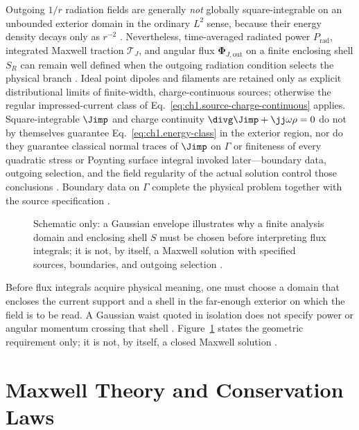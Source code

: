 Outgoing \(1/r\) radiation fields are generally \emph{not} globally square-integrable on an unbounded exterior domain in the ordinary \(L^2\) sense, because their energy density decays only as \(r^{-2}\) \cite{stratton1941}. Nevertheless, time-averaged radiated power \(P_{\mathrm{rad}}\), integrated Maxwell traction \(\boldsymbol{\mathcal{T}}_J\), and angular flux \(\boldsymbol{\Phi}_{J,\mathrm{out}}\) on a finite enclosing shell \(S_R\) can remain well defined when the outgoing radiation condition selects the physical branch \cite{stratton1941}. Ideal point dipoles and filaments are retained only as explicit distributional limits of finite-width, charge-continuous sources; otherwise the regular impressed-current class of Eq.~\eqref{eq:ch1.source-charge-continuous} applies. Square-integrable \(\Jimp\) and charge continuity \(\divg\Jimp+\jj\omega\rho=0\) do not by themselves guarantee Eq.~\eqref{eq:ch1.energy-class} in the exterior region, nor do they guarantee classical normal traces of \(\Jimp\) on \(\Gamma\) or finiteness of every quadratic stress or Poynting surface integral invoked later---boundary data, outgoing selection, and the field regularity of the actual solution control those conclusions \cite{stratton1941}. Boundary data on \(\Gamma\) complete the physical problem together with the source specification \cite{maxwell1873,stratton1941}.
\label{eq:ch1.admissible-space}

\begin{figure}[t]
\centering
\VolIPhysFig{\VolIPhysGaussianWaist}
\caption{Schematic only: a Gaussian envelope illustrates why a finite analysis domain and enclosing shell $S$ must be chosen before interpreting flux integrals; it is not, by itself, a Maxwell solution with specified sources, boundaries, and outgoing selection \cite{allen1992,stratton1941}.}
\label{fig:ch1.wp-gaussian-waist}
\end{figure}

Before flux integrals acquire physical meaning, one must choose a domain that encloses the
current support and a shell in the far-enough exterior on which the field is to be read. A
Gaussian waist quoted in isolation does not specify power or angular momentum crossing that
shell \cite{allen1992,stratton1941}. Figure~\ref{fig:ch1.wp-gaussian-waist} states the
geometric requirement only; it is not, by itself, a closed Maxwell solution
\cite{stratton1941}.

\section{Maxwell Theory and Conservation Laws}
\label{sec:ch01.1}

